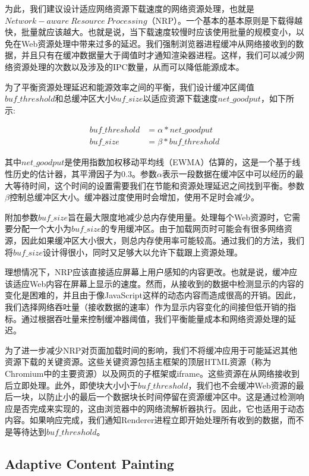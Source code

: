 \documentclass{sig-alternate-05-2015}
\begin{document}
为此，我们建议设计适应网络资源下载速度的网络资源处理，也就是$Network-aware\ Resource\ Processing$（NRP）\cite{1}。一个基本的基本原则是下载得越快，批量就应该越大。也就是说，当下载速度较慢时应该使用批量的规模变小，以免在Web资源处理中带来过多的延迟。我们强制浏览器进程缓冲从网络接收到的数据，并且只有在缓冲数据量大于阈值时才通知渲染器进程。这样，我们可以减少网络资源处理的次数以及涉及的IPC数量，从而可以降低能源成本。

为了平衡资源处理延迟和能源效率之间的平衡，我们设计缓冲区阈值$buf\_threshold$和总缓冲区大小$buf\_size$以适应资源下载速度$net\_goodput$，如下所示:

\begin{align*}
buf\_threshold &= \alpha * net\_goodput \\
buf\_size &= \beta * buf\_threshold
\end{align*}

其中$net\_goodput$是使用指数加权移动平均线（EWMA）估算的，这是一个基于线性历史的估计器，其平滑因子为$0.3$。\cite{9}\cite{10}参数$\alpha$表示一段数据在缓冲区中可以经历的最大等待时间，这个时间的设置需要我们在节能和资源处理延迟之间找到平衡。参数$\beta$控制总缓冲区大小。缓冲器过度使用时会增加，使用不足时会减少。

附加参数$buf\_size$旨在最大限度地减少总内存使用量。处理每个Web资源时，它需要分配一个大小为$buf\_size$的专用缓冲区。由于加载网页时可能会有很多网络资源，因此如果缓冲区大小很大，则总内存使用率可能较高。通过我们的方法，我们将$buf\_size$设计得很小，同时又足够大以允许下载跟上资源处理。

理想情况下，NRP应该直接适应屏幕上用户感知的内容更改。也就是说，缓冲应该适应Web内容在屏幕上显示的速度。然而，从接收到的数据中检测显示的内容的变化是困难的，并且由于像JavaScript这样的动态内容而造成很高的开销。因此，我们选择网络吞吐量（接收数据的速率）作为显示内容变化的间接但低开销的指标。通过根据吞吐量来控制缓冲器阈值，我们平衡能量成本和网络资源处理的延迟。

为了进一步减少NRP对页面加载时间的影响，我们不将缓冲应用于可能延迟其他资源下载的关键资源。这些关键资源包括主框架的顶层HTML资源（称为Chromium中的主要资源）以及网页的子框架或iframe。这些资源在从网络接收到后立即处理。此外，即使块大小小于$buf\_threshold$，我们也不会缓冲Web资源的最后一块，以防止小的最后一个数据块长时间停留在资源缓冲区中。这是通过检测响应是否完成来实现的，这由浏览器中的网络流解析器执行。因此，它也适用于动态内容。如果响应完成，我们通知Renderer进程立即开始处理所有收到的数据，而不是等待达到$buf\_threshold$。

\subsection{Adaptive Content Painting}
\end{document}
